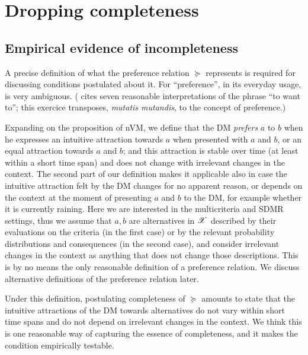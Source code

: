 \documentclass[french, english]{llncs}
\begin{document}
	\section{Dropping completeness}
	
	\subsection{Empirical evidence of incompleteness}
	\label{sec:empirical}
	A precise definition of what the preference relation $\succeq$ represents is required for discussing conditions postulated about it. For “preference”, in its everyday usage, is very ambiguous. (\citet{frankfurt_freedom_1971} cites seven reasonable interpretations of the phrase “to want to”; this exercice transposes, \emph{mutatis mutandis}, to the concept of preference.)
	
	Expanding on the proposition of nVM, we define that the \ac{DM} \emph{prefers} $a$ to $b$ when he expresses an intuitive attraction towards $a$ when presented with $a$ and $b$, or an equal attraction towards $a$ and $b$; and this attraction is stable over time (at least within a short time span) and does not change with irrelevant changes in the context. The second part of our definition makes it applicable also in case the intuitive attraction felt by the \ac{DM} changes for no apparent reason, or depends on the context at the moment of presenting $a$ and $b$ to the \ac{DM}, for example whether it is currently raining. Here we are interested in the multicriteria and SDMR settings, thus we assume that $a, b$ are alternatives in $\mathscr{X}$ described by their evaluations on the criteria (in the first case) or by the relevant probability distributions and consequences (in the second case), and consider irrelevant changes in the context as anything that does not change those descriptions. 
	This is by no means the only reasonable definition of a preference relation. We discuss alternative definitions of the preference relation later.
	
	Under this definition, postulating completeness of $\succeq$ amounts to state that the intuitive attractions of the \ac{DM} towards alternatives do not vary within short time spans and do not depend on irrelevant changes in the context. We think this is one reasonable way of capturing the essence of completeness, and it makes the condition empirically testable.
	
\end{document}
